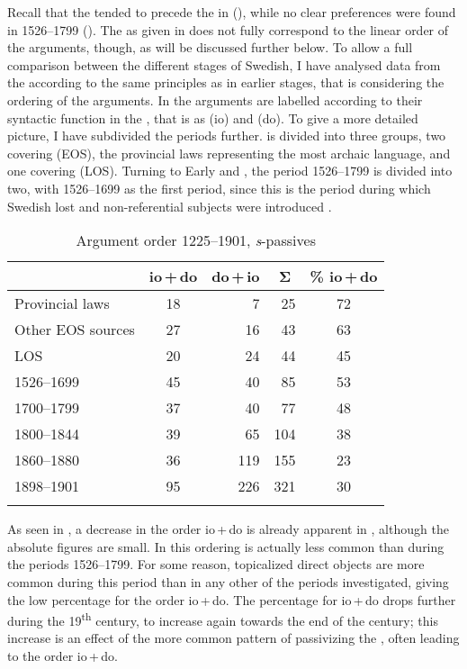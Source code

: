 \documentclass[output=paper]{langscibook}
\begin{document}
Recall that the  tended to precede the  in  (), while no clear preferences were found in 1526–1799 (). The  as given in  does not fully correspond to the linear order of the arguments, though, as will be discussed further below. To allow a full comparison between the different stages of Swedish, I have analysed data from the  according to the same principles as in earlier stages, that is considering the ordering of the arguments. In  the arguments are labelled according to their syntactic function in the , that is as  (io) and  (do). To give a more detailed picture, I have subdivided the periods further.  is divided into three groups, two covering  (EOS), the provincial laws representing the most archaic language, and one covering  (LOS). Turning to Early and , the period 1526–1799 is divided into two, with 1526–1699 as the first period, since this is the period during which Swedish lost  and non-referential subjects were introduced \citep{Falk1993}.


\begin{table}
\caption{Argument order 1225–1901, \textit{s}{}-passives}
\label{tab:falk:4}
\begin{tabular}{lcrrc}
\lsptoprule
& \multicolumn{1}{c}{io\,+\,do} & \multicolumn{1}{c}{do\,+\,io} & \multicolumn{1}{c}{Σ} & \multicolumn{1}{c}{\% io\,+\,do}\\\midrule
Provincial laws & 18 & 7 & 25 & 72\\
Other EOS sources & 27 & 16 & 43 & 63\\
LOS & 20 & 24 & 44 & 45\\
1526–1699 & 45 & 40 & 85 & 53\\
1700–1799 & 37 & 40 & 77 & 48\\
1800–1844 & 39 & 65 & 104 & 38\\
1860–1880 & 36 & 119 & 155 & 23 \\
1898–1901 & 95 & 226 & 321 & 30\\
\lspbottomrule
\end{tabular}
\end{table}

As seen in , a decrease in the order io\,+\,do is already apparent in , although the absolute figures are small. In  this ordering is actually less common than during the periods 1526–1799. For some reason, topicalized direct objects are more common during this period than in any other of the periods investigated, giving the low percentage for the order io\,+\,do. The percentage for io\,+\,do drops further during the 19\textsuperscript{th} century, to increase again towards the end of the century; this increase is an effect of the more common pattern of passivizing the , often leading to the order io\,+\,do.
\end{document}
